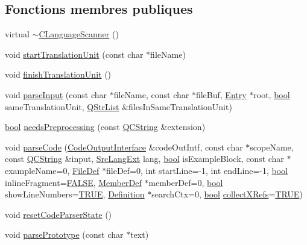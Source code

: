 \subsection*{Fonctions membres publiques}
\begin{DoxyCompactItemize}
\item 
virtual \hyperlink{class_c_language_scanner_a9b2496bc682fd1a3616254dc6bb077b8}{$\sim$\+C\+Language\+Scanner} ()
\item 
void \hyperlink{class_c_language_scanner_a8b667ac29ed52d3374f0df39a63d4c73}{start\+Translation\+Unit} (const char $\ast$file\+Name)
\item 
void \hyperlink{class_c_language_scanner_a03f5004bda27f5c73f3b9d74d9064b99}{finish\+Translation\+Unit} ()
\item 
void \hyperlink{class_c_language_scanner_a0a92c2f77d7b78987e8dad149a2f4171}{parse\+Input} (const char $\ast$file\+Name, const char $\ast$file\+Buf, \hyperlink{class_entry}{Entry} $\ast$root, \hyperlink{qglobal_8h_a1062901a7428fdd9c7f180f5e01ea056}{bool} same\+Translation\+Unit, \hyperlink{class_q_str_list}{Q\+Str\+List} \&files\+In\+Same\+Translation\+Unit)
\item 
\hyperlink{qglobal_8h_a1062901a7428fdd9c7f180f5e01ea056}{bool} \hyperlink{class_c_language_scanner_a88315d1d6591098e284bd2b91d4ba233}{needs\+Preprocessing} (const \hyperlink{class_q_c_string}{Q\+C\+String} \&extension)
\item 
void \hyperlink{class_c_language_scanner_a1d8d53789892f16d48fc90878d825f76}{parse\+Code} (\hyperlink{class_code_output_interface}{Code\+Output\+Interface} \&code\+Out\+Intf, const char $\ast$scope\+Name, const \hyperlink{class_q_c_string}{Q\+C\+String} \&input, \hyperlink{types_8h_a9974623ce72fc23df5d64426b9178bf2}{Src\+Lang\+Ext} lang, \hyperlink{qglobal_8h_a1062901a7428fdd9c7f180f5e01ea056}{bool} is\+Example\+Block, const char $\ast$example\+Name=0, \hyperlink{class_file_def}{File\+Def} $\ast$file\+Def=0, int start\+Line=-\/1, int end\+Line=-\/1, \hyperlink{qglobal_8h_a1062901a7428fdd9c7f180f5e01ea056}{bool} inline\+Fragment=\hyperlink{qglobal_8h_a10e004b6916e78ff4ea8379be80b80cc}{F\+A\+L\+S\+E}, \hyperlink{class_member_def}{Member\+Def} $\ast$member\+Def=0, \hyperlink{qglobal_8h_a1062901a7428fdd9c7f180f5e01ea056}{bool} show\+Line\+Numbers=\hyperlink{qglobal_8h_a04a6422a52070f0dc478693da640242b}{T\+R\+U\+E}, \hyperlink{class_definition}{Definition} $\ast$search\+Ctx=0, \hyperlink{qglobal_8h_a1062901a7428fdd9c7f180f5e01ea056}{bool} \hyperlink{tclscanner_8cpp_ac23b94d6976d5bb0c9f1885c5a2e7a53}{collect\+X\+Refs}=\hyperlink{qglobal_8h_a04a6422a52070f0dc478693da640242b}{T\+R\+U\+E})
\item 
void \hyperlink{class_c_language_scanner_a2d569ccde3f87597741b3cde8efb3af5}{reset\+Code\+Parser\+State} ()
\item 
void \hyperlink{class_c_language_scanner_afabfbfe6ca101e1d0d02fed9d197cad1}{parse\+Prototype} (const char $\ast$text)
\end{DoxyCompactItemize}


